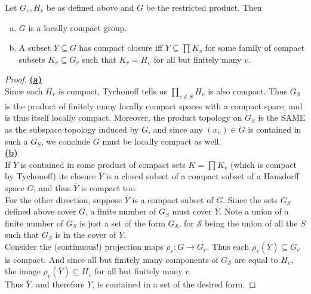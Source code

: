 \documentclass[11pt, x11names]{article}
\newcommand{\fans}{\mathscr{S}}
\renewcommand{\bar}[1]{\overline{#1}}
\begin{document}
\begin{prop}
\label{restricted product properties}
Let $G_v, H_v$ be as defined above and $G$ be the restricted product. Then
\begin{enumerate}[(a)]
    \item $G$ is a locally compact group.
    \item A subset $Y \subseteq G$ has compact closure iff $Y \subseteq \prod K_v$ for some family of compact subsets $K_v \subseteq G_v$ such that $K_v = H_v$ for all but finitely many $v$.
\end{enumerate}
\end{prop}
\begin{proof}
\textbf{\underline{(a)}}\\
Since each $H_v$ is compact, Tychonoff tells us $\prod_{v \notin S} H_v$ is also compact. Thus $G_S$ is the product of finitely many locally compact spaces with a compact space, and is thus itself locally compact. Moreover, the product topology on $G_S$ is the SAME as the subspace topology induced by $G$, and since any $(x_v) \in G$ is contained in such a $G_S$, we conclude $G$ must be locally compact as well.\\

\textbf{\underline{(b)}}\\
If $Y$ is contained in some product of compact sets $ K = \prod K_v$ (which is compact by Tychonoff) its closure $\bar{Y}$ is a closed subset of a compact subset of a Hausdorff space $G$, and thus $\bar{Y}$ is compact too.\\
For the other direction, suppose $\bar{Y}$ is a compact subset of $G$. Since the sets $G_S$ defined above cover $G$, a finite number of $G_S$ must cover $\bar{Y}$. Note a union of a finite number of $G_S$ is just a set of the form $G_{\fans}$, for $\fans$ being the union of all the $S$ such that $G_S$ is in the cover of $\bar{Y}$.\\
Consider the (continuous!) projection maps $\rho_v: G \to G_v$. Thus each $\rho_v(\bar{Y}) \subseteq G_v$ is compact. And since all but finitely many components of $G_{\fans}$ are equal to $H_v$, the image $\rho_v(\bar{Y}) \subseteq H_v$ for all but finitely many $v$.\\
Thus $\bar{Y}$, and therefore $Y$, is contained in a set of the desired form.
\end{proof}
\end{document}
